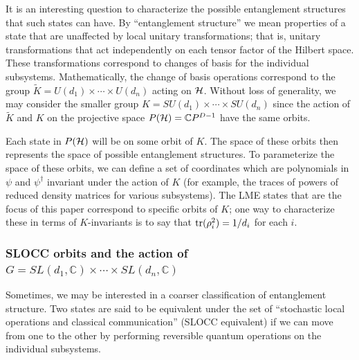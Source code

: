 \documentclass[12pt]{article}
\theoremstyle{definition}
\newcommand{\tr}{{\rm tr}}
\begin{document}
It is an interesting question to characterize the possible
entanglement structures that such states can have. By ``entanglement
structure'' we mean properties of a state that are unaffected by local
unitary transformations; that is, unitary transformations that act
independently on each tensor factor of the Hilbert space. These
transformations correspond to changes of basis for the individual
subsystems. Mathematically, the change of basis operations correspond
to the group $\tilde{K} = U(d_1) \times \cdots \times U(d_n)$ acting
on ${\cal H}$. Without loss of generality, we may consider the smaller
group $K = SU(d_{1})\times \dotsb \times SU(d_{n})$ since the action
of $\tilde{K}$ and $K$ on the projective space $P({\cal H}) = \mathbb{C}
P^{D-1}$ have the same orbits. 

Each state in $P({\cal H})$ will be on some orbit of $K$. The space of these orbits then represents the space of possible entanglement structures. To parameterize the space of these orbits, we can define a set of coordinates which are polynomials in $\psi$ and $\psi^\dagger$ invariant under the action of $K$ (for example, the traces of powers of reduced density matrices for various subsystems). The LME states that are the focus of this paper correspond to specific orbits of $K$; one way to characterize these in terms of $K$-invariants is to say that $\tr(\rho_i^2) = 1/d_i$ for each $i$.

\subsubsection{SLOCC orbits and the action of $G = SL(d_1,\mathbb{C}) \times \cdots \times SL(d_n,\mathbb{C})$}

Sometimes, we may be interested in a coarser classification of entanglement structure. Two states are said to be equivalent under the set of ``stochastic local operations and classical communication'' (SLOCC equivalent) if we can move from one to the other by performing reversible quantum operations on the individual subsystems.
\end{document}
